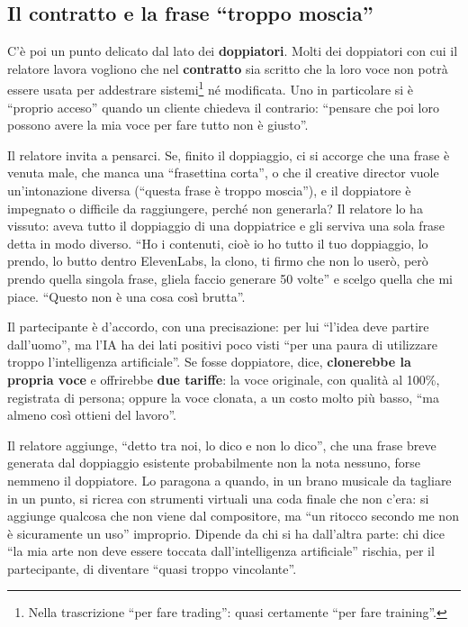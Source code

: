 \subsection{Il contratto e la frase ``troppo moscia''}

C'è poi un punto delicato dal lato dei \textbf{doppiatori}. Molti dei doppiatori
con cui il relatore lavora vogliono che nel \textbf{contratto} sia scritto che la
loro voce non potrà essere usata per addestrare sistemi\footnote{Nella
trascrizione ``per fare trading'': quasi certamente ``per fare training''.} né
modificata. Uno in particolare si è ``proprio acceso'' quando un cliente chiedeva
il contrario: ``pensare che poi loro possono avere la mia voce per fare tutto non
è giusto''.

Il relatore invita a pensarci. Se, finito il doppiaggio, ci si accorge che una
frase è venuta male, che manca una ``frasettina corta'', o che il creative
director vuole un'intonazione diversa (``questa frase è troppo moscia''), e il
doppiatore è impegnato o difficile da raggiungere, perché non generarla? Il
relatore lo ha vissuto: aveva tutto il doppiaggio di una doppiatrice e gli
serviva una sola frase detta in modo diverso. ``Ho i contenuti, cioè io ho tutto
il tuo doppiaggio, lo prendo, lo butto dentro ElevenLabs, la clono, ti firmo che
non lo userò, però prendo quella singola frase, gliela faccio generare 50 volte''
e scelgo quella che mi piace. ``Questo non è una cosa così brutta''.

Il partecipante è d'accordo, con una precisazione: per lui ``l'idea deve partire
dall'uomo'', ma l'IA ha dei lati positivi poco visti ``per una paura di
utilizzare troppo l'intelligenza artificiale''. Se fosse doppiatore, dice,
\textbf{clonerebbe la propria voce} e offrirebbe \textbf{due tariffe}: la voce
originale, con qualità al 100\%, registrata di persona; oppure la voce clonata, a
un costo molto più basso, ``ma almeno così ottieni del lavoro''.

Il relatore aggiunge, ``detto tra noi, lo dico e non lo dico'', che una frase
breve generata dal doppiaggio esistente probabilmente non la nota nessuno, forse
nemmeno il doppiatore. Lo paragona a quando, in un brano musicale da tagliare in
un punto, si ricrea con strumenti virtuali una coda finale che non c'era: si
aggiunge qualcosa che non viene dal compositore, ma ``un ritocco secondo me non è
sicuramente un uso'' improprio. Dipende da chi si ha dall'altra parte: chi dice
``la mia arte non deve essere toccata dall'intelligenza artificiale'' rischia,
per il partecipante, di diventare ``quasi troppo vincolante''.

